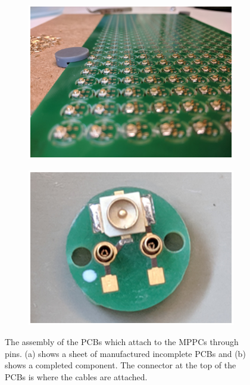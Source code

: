 \begin{figure}[!h]
\centering
\begin{subfigure}{.5\textwidth}
  \centering
  \includegraphics[width=\linewidth]{Chapter3/Figs/Raster/detCon008b_PlacingPcbs.png}
  \captionsetup{width=.9\linewidth}
  \caption{}
  \label{subFig:detCon008b_PlacingPcbs}
\end{subfigure}%
\begin{subfigure}{.5\textwidth}
  \centering
  \includegraphics[width=\linewidth]{Chapter3/Figs/Raster/detCon009b_SoloPcb.png}
  \captionsetup{width=.9\linewidth}
  \caption{}
  \label{subFig:detCon009b_SoloPcb}
\end{subfigure}
\caption[Assembly of the MPPC PCBs.]{The assembly of the PCBs which attach to the MPPCs through pins. (a) shows a sheet of manufactured incomplete PCBs and (b) shows a completed component. The connector at the top of the PCBs is where the cables are attached. }
\label{fig:detCon_PlacingPcbs_SoloPcb}
\end{figure}

